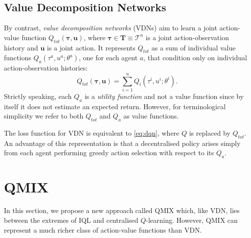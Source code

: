 \documentclass[twoside,11pt]{article}
\renewcommand{\cite}{\citep}
\begin{document}
\subsection{Value Decomposition Networks}

By contrast, \textit{value decomposition networks} (VDNs) \citep{sunehag_value-decomposition_2017} aim to learn a joint action-value function $Q_{tot}(\boldsymbol{\tau},\mathbf{u})$, where $ \bm{\tau} \in \mathbf{T} \equiv \mathcal{T}^n $ is a joint action-observation history and $ \mathbf{u} $ is a joint action.  It represents $Q_{tot}$ as a sum of individual value functions $Q_a (\tau^a, u^a;\theta^a)$, one for each agent $a$, that condition only on individual action-observation histories:
\begin{equation}\label{eq:vdn}
Q_{tot}(\boldsymbol{\tau}, \mathbf{u}) = \sum_{i=1}^n Q_i (\tau^i, u^i;\theta^i).
\end{equation}
Strictly speaking, each $Q_a$ is a \textit{utility function} \cite{guestrin_multiagent_2002} and not a value function since by itself it does not estimate an expected return.  However, for terminological simplicity we refer to both $Q_{tot}$ and $Q_a$ as value functions.

The loss function for VDN is equivalent to \eqref{eq:dqn}, where $Q$ is replaced by $Q_{tot}$.  An advantage of this representation is that a decentralised policy arises simply from each agent performing greedy action selection with respect to its $Q_a$. 
 \section{QMIX}

\label{sec:methods}

In this section, we propose a new approach called QMIX which, like VDN, lies 
between the extremes of IQL and centralised $Q$-learning. However, QMIX can represent a much richer class of action-value functions than VDN. 
\end{document}
